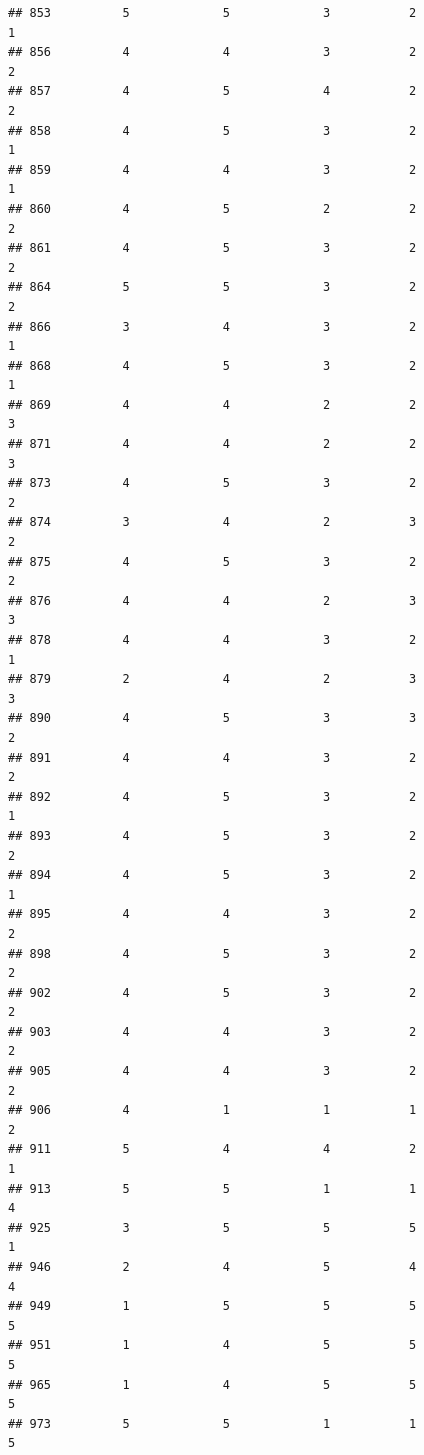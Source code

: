 \documentclass[
]{article}
\begin{document}
\begin{verbatim}
## 853          5             5             3           2             1
## 856          4             4             3           2             2
## 857          4             5             4           2             2
## 858          4             5             3           2             1
## 859          4             4             3           2             1
## 860          4             5             2           2             2
## 861          4             5             3           2             2
## 864          5             5             3           2             2
## 866          3             4             3           2             1
## 868          4             5             3           2             1
## 869          4             4             2           2             3
## 871          4             4             2           2             3
## 873          4             5             3           2             2
## 874          3             4             2           3             2
## 875          4             5             3           2             2
## 876          4             4             2           3             3
## 878          4             4             3           2             1
## 879          2             4             2           3             3
## 890          4             5             3           3             2
## 891          4             4             3           2             2
## 892          4             5             3           2             1
## 893          4             5             3           2             2
## 894          4             5             3           2             1
## 895          4             4             3           2             2
## 898          4             5             3           2             2
## 902          4             5             3           2             2
## 903          4             4             3           2             2
## 905          4             4             3           2             2
## 906          4             1             1           1             2
## 911          5             4             4           2             1
## 913          5             5             1           1             4
## 925          3             5             5           5             1
## 946          2             4             5           4             4
## 949          1             5             5           5             5
## 951          1             4             5           5             5
## 965          1             4             5           5             5
## 973          5             5             1           1             5

\end{verbatim}
\end{document}
